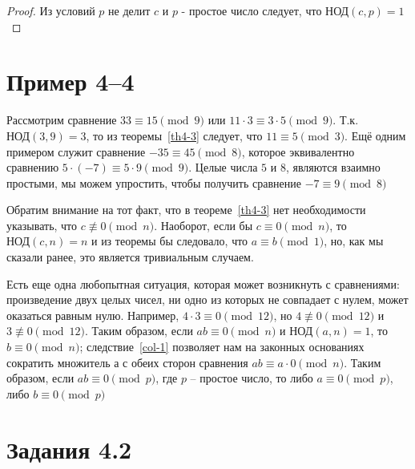 \documentclass[11pt]{article}
\begin{document}
	\begin{proof}
		Из условий $p$ не делит $c$ и $p$ - простое число следует, что $\text{НОД} (c,p) = 1$
	\end{proof}
	
	\section*{Пример 4--4}
	
	Рассмотрим сравнение $33\equiv 15 \pmod 9$ или $11\cdot3\equiv 3\cdot5 \pmod 9$. Т.к. $\text{НОД} (3,9) = 3$, то из теоремы~\ref{th4-3} следует, что $11\equiv 5 \pmod 3$. Ещё одним примером служит сравнение ${-35\equiv 45 \pmod 8}$, которое эквивалентно сравнению $5\cdot(-7)\equiv 5\cdot9 \pmod 9$. Целые числа $5$ и $8$, являются взаимно простыми, мы можем упростить, чтобы получить сравнение $-7\equiv 9 \pmod8$
	
	
	\thispagestyle{fancy}
	\rhead{\thepage}
	
	Обратим внимание на тот факт, что в теореме~\ref{th4-3} нет необходимости указывать, что  ${c \not\equiv 0 \pmod n}$.
	Наоборот, если бы  $c \equiv 0 \pmod n$, то $\text{НОД} (c,n) = n$ и из теоремы бы следовало, что  $a\equiv b \pmod 1$, но, как мы сказали ранее, это является тривиальным случаем.
	
	Есть еще одна любопытная ситуация, которая может возникнуть с сравнениями: произведение двух целых чисел, ни одно из которых не совпадает с нулем, может оказаться равным нулю. Например, $4\cdot 3\equiv0 \pmod {12}$, но $4\not\equiv0 \pmod {12}$ и $3\not\equiv0 \pmod {12}$. Таким образом, если $ab\equiv0\pmod n$ и $\text{НОД} (a,n) = 1$, то $b\equiv0\pmod n$; следствие~\ref{col-1} позволяет нам на законных основаниях сократить множитель $а$ с обеих сторон сравнения
	$ab\equiv a\cdot0\pmod n$. Таким образом, если $ab\equiv0\pmod p$, где $p$ -- простое число, то либо $a\equiv0\pmod p$, либо $b\equiv0\pmod p$
	
	\section* {\center Задания 4.2}
	
\end{document}
